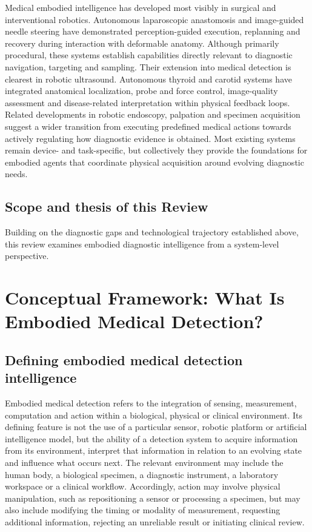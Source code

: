 \documentclass[12pt,a4paper]{article}
\newif\ifshowplaceholders
\newcommand{\outlineplaceholder}{%
\ifshowplaceholders
\par\noindent\textit{[Content to be developed.]}\par\medskip
\fi
}
\begin{document}
Medical embodied intelligence has developed most visibly in surgical and interventional robotics. Autonomous laparoscopic anastomosis and image-guided needle steering have demonstrated perception-guided execution, replanning and recovery during interaction with deformable anatomy. Although primarily procedural, these systems establish capabilities directly relevant to diagnostic navigation, targeting and sampling. Their extension into medical detection is clearest in robotic ultrasound. Autonomous thyroid and carotid systems have integrated anatomical localization, probe and force control, image-quality assessment and disease-related interpretation within physical feedback loops. Related developments in robotic endoscopy, palpation and specimen acquisition suggest a wider transition from executing predefined medical actions towards actively regulating how diagnostic evidence is obtained. Most existing systems remain device- and task-specific, but collectively they provide the foundations for embodied agents that coordinate physical acquisition around evolving diagnostic needs.


\subsection{Scope and thesis of this Review}
\label{subsec:scope_thesis}

Building on the diagnostic gaps and technological trajectory established above, this review examines embodied diagnostic intelligence from a system-level perspective. 


\section{Conceptual Framework: What Is Embodied Medical Detection?}
\label{sec:conceptual_framework}

\subsection{Defining embodied medical detection intelligence}
\label{subsec:defining_embodied_medical_detection}
Embodied medical detection refers to the integration of sensing, measurement, computation and action within a biological, physical or clinical environment. Its defining feature is not the use of a particular sensor, robotic platform or artificial intelligence model, but the ability of a detection system to acquire information from its environment, interpret that information in relation to an evolving state and influence what occurs next. The relevant environment may include the human body, a biological specimen, a diagnostic instrument, a laboratory workspace or a clinical workflow. Accordingly, action may involve physical manipulation, such as repositioning a sensor or processing a specimen, but may also include modifying the timing or modality of measurement, requesting additional information, rejecting an unreliable result or initiating clinical review.
\end{document}
